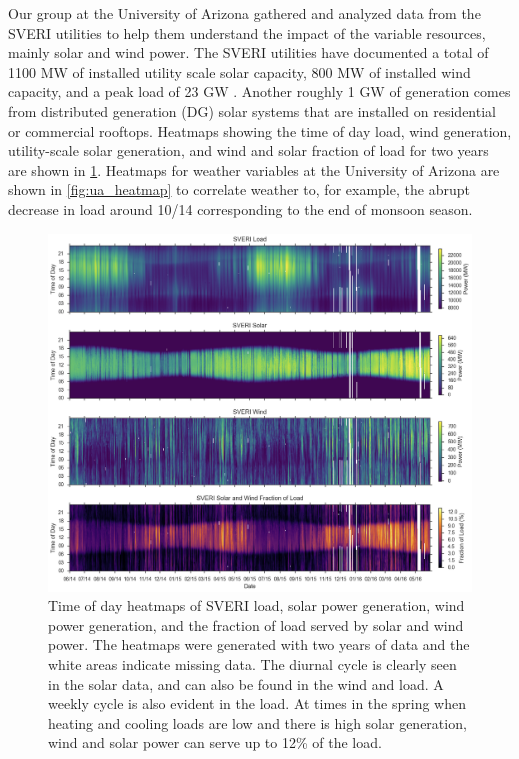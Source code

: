 Our group at the University of Arizona gathered and analyzed data from
the SVERI utilities to help them understand the impact of the variable
resources, mainly solar and wind power.
The SVERI utilities have documented a total of 1100 MW of installed
utility scale solar capacity, 800 MW of installed wind capacity, and a
peak load of 23 GW \citep{sveri_website}.
Another roughly 1 GW of generation comes from distributed generation
(DG) solar systems that are installed on residential or commercial
rooftops.
Heatmaps showing the time of day load, wind generation, utility-scale
solar generation, and wind and solar fraction of load for two years
are shown in \cref{fig:sveri_heatmap}.
Heatmaps for weather variables at the University of Arizona are shown
in \cref{fig:ua_heatmap} to correlate weather to, for example, the
abrupt decrease in load around 10/14 corresponding to the end of monsoon season.

\begin{figure}[p]
\centering
\includegraphics[width=\textwidth]{figs/sveri_heat.png}
\caption[Heatmaps of SVERI load, solar power, wind power, and
renewable load fraction]{Time of day heatmaps of SVERI load, solar
  power generation, wind power generation, and the fraction of load
  served by solar and wind power. The heatmaps were generated with two
  years of data and the white areas indicate missing data. The diurnal
  cycle is clearly seen in the solar data, and can also be found in
  the wind and load. A weekly cycle is also evident in the load. At
  times in the spring when heating and cooling loads are low and there
  is high solar generation, wind and solar power can serve up to 12\%
  of the load.}
\label{fig:sveri_heatmap}
\end{figure}

